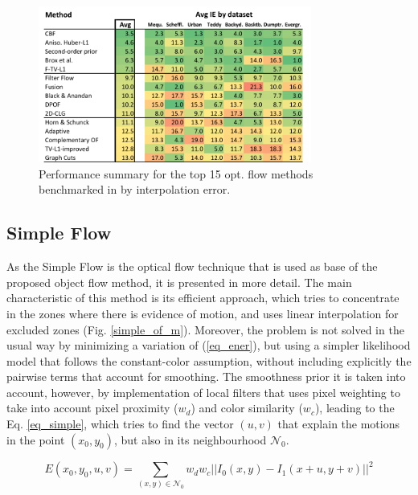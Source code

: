    \begin{figure}[thpb]
      \centering
      \includegraphics[width=0.8\textwidth]{../images/of_performance.png}
      \caption{ Performance summary for the top 15 opt. flow methods benchmarked in \cite{c17} by interpolation error. }
      \label{of_per}
   \end{figure}

\subsection{Simple Flow}

As the Simple Flow \cite{c21} is the optical flow technique that is used as base of the proposed 
object flow method, it is presented in more detail. 
The main characteristic of this method is its efficient approach, which tries to concentrate in the zones where there is evidence of motion, and uses linear 
interpolation for excluded zones (Fig. \ref{simple_of_m}). 
Moreover, the problem is not solved in the usual way by minimizing a variation of (\ref{eq_ener}), but using a simpler likelihood model that 
follows the constant-color assumption, without including explicitly the pairwise terms that account for smoothing. The smoothness prior it is taken into 
account, however, by implementation of local filters that uses pixel weighting to take into account pixel proximity ($w_d$) and color similarity ($w_c$), leading to the Eq. \ref{eq_simple}, which tries 
to find the vector $(u,v)$ that explain the motions in the point $(x_0,y_0)$, but also in its 
neighbourhood $\mathcal{N}_{0}$.

\begin{equation}
E(x_0, y_0, u, v) = \sum_{(x,y) \in \mathcal{N}_{0}} w_{d}w_{c}||  I_{0}(x,y) - I_{1}(x+u,y+v) ||^2
\label{eq_simple}
\end{equation}


